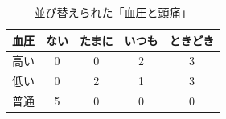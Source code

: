 \begin{table}[ht]
	\begin{center}
		\caption{並び替えられた「血圧と頭痛」}
		\begin{tabular}{c|cccc}
			血圧 & ない & たまに & いつも & ときどき \\
			\hline
			高い & 0  & 0   & 2   & 3    \\
			低い & 0  & 2   & 1   & 3    \\
			普通 & 5  & 0   & 0   & 0    \\
		\end{tabular}
		\label{tbl::14_02}
	\end{center}
\end{table}

